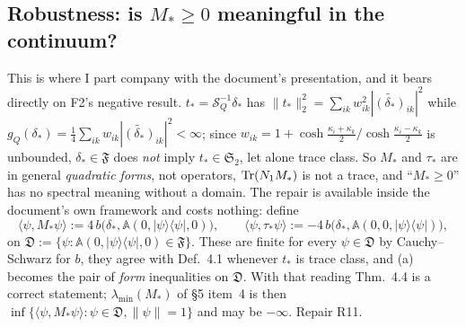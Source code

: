 \documentclass[11pt]{article}
\newcommand{\SLD}{\mathcal S_Q}
\newcommand{\Aop}{\mathbb A}
\newcommand{\Stwo}{\mathfrak S_2}
\begin{document}
\subsection{Robustness: is $M_*\ge0$ meaningful in the continuum?}\label{sec:robust}
This is where I part company with the document's presentation, and it bears directly on
F2's negative result.  $t_*=\SLD^{-1}\delta_*$ has
$\|t_*\|_2^2=\sum_{ik}w_{ik}^2|\widetilde{(\delta_*)}_{ik}|^2$ while
$g_Q(\delta_*)=\frac14\sum_{ik}w_{ik}|\widetilde{(\delta_*)}_{ik}|^2<\infty$; since
$w_{ik}=1+\cosh\frac{\kappa_i+\kappa_k}2/\cosh\frac{\kappa_i-\kappa_k}2$ is unbounded,
$\delta_*\in\mathfrak F$ does \emph{not} imply $t_*\in\Stwo$, let alone trace class.  So
$M_*$ and $\tau_*$ are in general \emph{quadratic forms}, not operators, $\operatorname{Tr}(N_1M_*)$ is
not a trace, and ``$M_*\ge0$'' has no spectral meaning without a domain.  The repair is
available inside the document's own framework and costs nothing: define
\begin{equation}\label{eq:formdef}
 \langle\psi,M_*\psi\rangle:=4\,b\bigl(\delta_*,\Aop(0,|\psi\rangle\langle\psi|,0)\bigr),\qquad
 \langle\psi,\tau_*\psi\rangle:=-4\,b\bigl(\delta_*,\Aop(0,0,|\psi\rangle\langle\psi|)\bigr),
\end{equation}
on $\mathfrak D:=\{\psi:\Aop(0,|\psi\rangle\langle\psi|,0)\in\mathfrak F\}$.  These are
finite for every $\psi\in\mathfrak D$ by Cauchy--Schwarz for $b$, they agree with
Def.~4.1 whenever $t_*$ is trace class, and (a) becomes the pair of \emph{form}
inequalities on $\mathfrak D$.  With that reading Thm.~4.4 is a correct statement;
$\lambda_{\min}(M_*)$ of \S5 item~4 is then $\inf\{\langle\psi,M_*\psi\rangle:\psi\in\mathfrak D,\|\psi\|=1\}$
and may be $-\infty$.  Repair R11.
\end{document}
